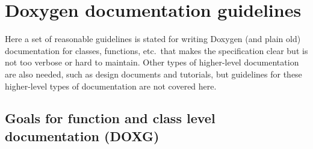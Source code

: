 %
\section{Doxygen documentation guidelines}
%

Here a set of reasonable guidelines is stated for writing Doxygen (and plain
old) documentation for classes, functions, etc.\ that makes the specification
clear but is not too verbose or hard to maintain.  Other types of higher-level
documentation are also needed, such as design documents and tutorials, but
guidelines for these higher-level types of documentation are not covered here.

%
\subsection{Goals for function and class level documentation (DOXG)}
%

